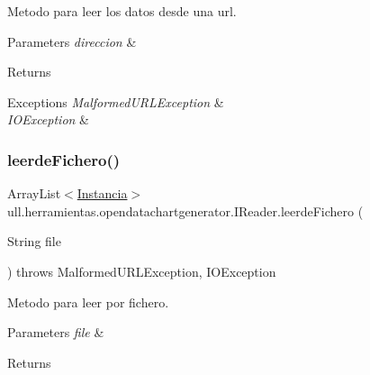 Metodo para leer los datos desde una url. 


\begin{DoxyParams}{Parameters}
{\em direccion} & \\
\hline
\end{DoxyParams}
\begin{DoxyReturn}{Returns}

\end{DoxyReturn}

\begin{DoxyExceptions}{Exceptions}
{\em Malformed\+U\+R\+L\+Exception} & \\
\hline
{\em I\+O\+Exception} & \\
\hline
\end{DoxyExceptions}
\mbox{\label{classull_1_1herramientas_1_1opendatachartgenerator_1_1_i_reader_a367ada0f7191f71f6501d6c6a1a64aaa}} 
\subsubsection{\texorpdfstring{leerde\+Fichero()}{leerdeFichero()}}
{\footnotesize\ttfamily Array\+List$<$\mbox{\hyperlink{classull_1_1herramientas_1_1opendatachartgenerator_1_1_instancia}{Instancia}}$>$ ull.\+herramientas.\+opendatachartgenerator.\+I\+Reader.\+leerde\+Fichero (\begin{DoxyParamCaption}\item[{String}]{file }\end{DoxyParamCaption}) throws Malformed\+U\+R\+L\+Exception, I\+O\+Exception}



Metodo para leer por fichero. 


\begin{DoxyParams}{Parameters}
{\em file} & \\
\hline
\end{DoxyParams}
\begin{DoxyReturn}{Returns}

\end{DoxyReturn}

